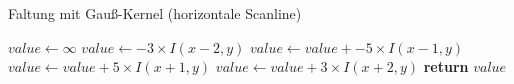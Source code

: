 \begin{algorithm}
	\caption{Faltung mit Gauß-Kernel (horizontale Scanline)}
	\label{src:analyseConvolution}
	\begin{algorithmic}[1]
		\State $value \gets \infty$
		\State $value \gets -3 \times I(x - 2, y)$
		\State $value \gets value + -5 \times I(x - 1, y)$
		\State $value \gets value + 5 \times I(x + 1, y)$
		\State $value \gets value + 3 \times I(x + 2, y)$
		\State \textbf{return} $value$
		\EndProcedure
	\end{algorithmic}
\end{algorithm}
